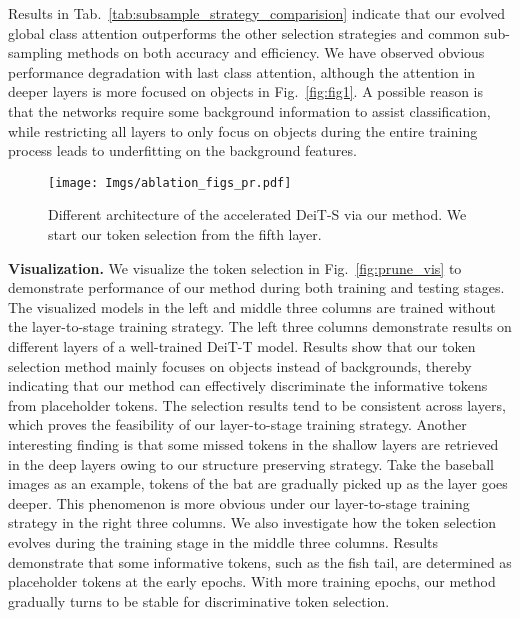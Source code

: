 \documentclass[letterpaper]{article} \usepackage{aaai22}  \usepackage{times}  \usepackage{helvet}  \usepackage{courier}  \usepackage[hyphens]{url}  \usepackage{graphicx} \urlstyle{rm} \def\UrlFont{\rm}  \usepackage{natbib}  \usepackage{caption} \DeclareCaptionStyle{ruled}{labelfont=normalfont,labelsep=colon,strut=off} \frenchspacing  \setlength{\pdfpagewidth}{8.5in}  \setlength{\pdfpageheight}{11in}  \usepackage{algorithm}
\begin{document}
Results in Tab.~\ref{tab:subsample_strategy_comparision} indicate that our evolved global class attention outperforms the other selection strategies and common sub-sampling methods on both accuracy and efficiency. We have observed obvious performance degradation with last class attention, although the attention in deeper layers is more focused on objects in Fig.~\ref{fig:fig1}. A possible reason is that the networks require some background information to assist classification, while restricting all layers to only focus on objects during the entire training process leads to underfitting on the background features.

\begin{figure}[t]
    \centering
    \texttt{[image: Imgs/ablation\_figs\_pr.pdf]} \caption{Different architecture of the accelerated DeiT-S via our method. We start our token selection from the fifth layer.}
    \label{fig:abl_diff_pr}
    \vspace{-5mm}
\end{figure} 
\noindent\textbf{Visualization.}
We visualize the token selection in Fig.~\ref{fig:prune_vis} to demonstrate performance of our method during both training and testing stages. The visualized models in the left and middle three columns are trained without the layer-to-stage training strategy.
The left three columns demonstrate results on different layers of a well-trained DeiT-T model. 
Results show that our token selection method mainly focuses on objects instead of backgrounds, thereby indicating that our method can effectively discriminate the informative tokens from placeholder tokens. 
The selection results tend to be consistent across layers, which proves the feasibility of our layer-to-stage training strategy.
Another interesting finding is that some missed tokens in the shallow layers are retrieved in the deep layers owing to our structure preserving strategy. 
Take the baseball images as an example, tokens of the bat are gradually picked up as the layer goes deeper. 
This phenomenon is more obvious under our layer-to-stage training strategy in the right three columns. 
We also investigate how the token selection evolves during the training stage in the middle three columns. Results demonstrate that some informative tokens, such as the fish tail, are determined as placeholder tokens at the early epochs. With more training epochs, our method gradually turns to be stable for discriminative token selection.
\end{document}
